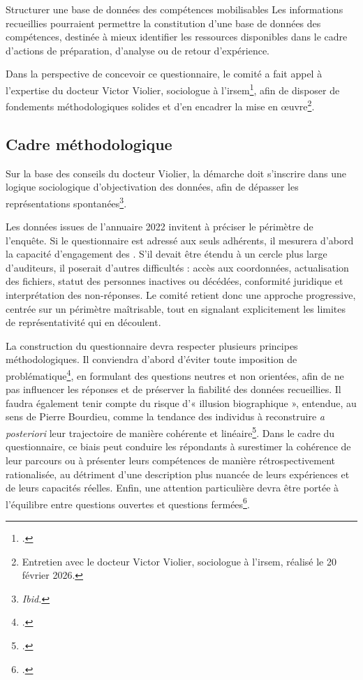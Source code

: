 \begin{subproposition}{Structurer une base de données des compétences mobilisables}
Les informations recueillies pourraient permettre la constitution d'une base de données des compétences, destinée à mieux identifier les ressources disponibles dans le cadre d'actions de préparation, d'analyse ou de retour d'expérience.
\end{subproposition}

Dans la perspective de concevoir ce questionnaire, le comité a fait appel à l'expertise du docteur Victor Violier, sociologue à l'\gls{irsem}\footcite{violier_irsem}, afin de disposer de fondements méthodologiques solides et d'en encadrer la mise en \oe{}uvre\footnote{Entretien avec le docteur Victor Violier, sociologue à l'\gls{irsem}, réalisé le 20 février 2026.}.

\clearpage

\subsection{Cadre méthodologique}

Sur la base des conseils du docteur Violier, la démarche doit s'inscrire dans une logique sociologique d'objectivation des données, afin de dépasser les représentations spontanées\footnote{\textit{Ibid.}}.

Les données issues de l'annuaire 2022 invitent à préciser le périmètre de l'enquête. Si le questionnaire est adressé aux seuls adhérents, il mesurera d'abord la capacité d'engagement des \AssociationsUnionIHEDN. S'il devait être étendu à un cercle plus large d'auditeurs, il poserait d'autres difficultés : accès aux coordonnées, actualisation des fichiers, statut des personnes inactives ou décédées, conformité juridique et interprétation des non-réponses. Le comité retient donc une approche progressive, centrée sur un périmètre maîtrisable, tout en signalant explicitement les limites de représentativité qui en découlent.

La construction du questionnaire devra respecter plusieurs principes méthodologiques. Il conviendra d'abord d'éviter toute imposition de problématique\footcite{Bourdieu1986}, en formulant des questions neutres et non orientées, afin de ne pas influencer les réponses et de préserver la fiabilité des données recueillies. Il faudra également tenir compte du risque d'« illusion biographique », entendue, au sens de Pierre Bourdieu, comme la tendance des individus à reconstruire \textit{a posteriori} leur trajectoire de manière cohérente et linéaire\footcite[69]{Bourdieu1986}. Dans le cadre du questionnaire, ce biais peut conduire les répondants à surestimer la cohérence de leur parcours ou à présenter leurs compétences de manière rétrospectivement rationalisée, au détriment d'une description plus nuancée de leurs expériences et de leurs capacités réelles. Enfin, une attention particulière devra être portée à l'équilibre entre questions ouvertes et questions fermées\footcite[65]{Fenneteau2015}.

